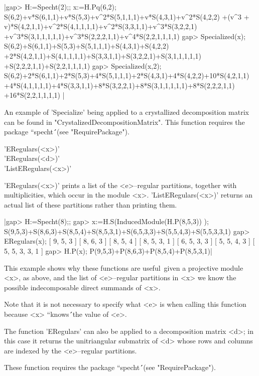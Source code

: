 |gap> H:=Specht(2);; x:=H.Pq(6,2);
S(6,2)+v*S(6,1,1)+v*S(5,3)+v^2*S(5,1,1,1)+v*S(4,3,1)+v^2*S(4,2,2)
+(v^3 + v)*S(4,2,1,1)+v^2*S(4,1,1,1,1)+v^2*S(3,3,1,1)+v^3*S(3,2,2,1)
+v^3*S(3,1,1,1,1,1)+v^3*S(2,2,2,1,1)+v^4*S(2,2,1,1,1,1)
gap> Specialized(x);
S(6,2)+S(6,1,1)+S(5,3)+S(5,1,1,1)+S(4,3,1)+S(4,2,2)
+2*S(4,2,1,1)+S(4,1,1,1,1)+S(3,3,1,1)+S(3,2,2,1)+S(3,1,1,1,1,1)
+S(2,2,2,1,1)+S(2,2,1,1,1,1)
gap> Specialized(x,2);
S(6,2)+2*S(6,1,1)+2*S(5,3)+4*S(5,1,1,1)+2*S(4,3,1)+4*S(4,2,2)+10*S(4,2,1,1)
+4*S(4,1,1,1,1)+4*S(3,3,1,1)+8*S(3,2,2,1)+8*S(3,1,1,1,1,1)+8*S(2,2,2,1,1)
+16*S(2,2,1,1,1,1) |

An example of 'Specialize' being applied to a crystallized decomposition
matrix can be found in "CrystalizedDecompositionMatrix". This function
requires the package ``specht\'\'\ (see "RequirePackage").



'ERegulars(<x>)'\\
'ERegulars(<d>)'\\
'ListERegulars(<x>)'

'ERegulars(<x>)' prints a list of the <e>--regular partitions, together 
with multiplicities, which occur in the module <x>. 'ListERegulars(<x>)'
returns an actual list of these partitions rather than printing them.

|gap> H:=Specht(8);;
gap> x:=H.S(InducedModule(H.P(8,5,3)) );  
S(9,5,3)+S(8,6,3)+S(8,5,4)+S(8,5,3,1)+S(6,5,3,3)+S(5,5,4,3)+S(5,5,3,3,1)
gap> ERegulars(x);
[ 9, 5, 3 ]  [ 8, 6, 3 ]  [ 8, 5, 4 ]  [ 8, 5, 3, 1 ]  
[ 6, 5, 3, 3 ]  [ 5, 5, 4, 3 ]  [ 5, 5, 3, 3, 1 ]  
gap> H.P(x);
P(9,5,3)+P(8,6,3)+P(8,5,4)+P(8,5,3,1)|

This example shows why these functions are useful\:\ given a projective
module <x>, as above, and the list of <e>--regular partitions in
<x> we know the possible indecomposable direct summands of <x>.

Note that it is not necessary to specify what <e> is when calling this
function because <x> ``knows\'\'\ the value of <e>. 

The function 'ERegulars' can also be applied to a decomposition 
matrix <d>; in this case it returns the unitriangular submatrix of <d>
whose rows and columns are indexed by the <e>--regular partitions.

These function requires the package ``specht\'\'\ (see "RequirePackage").

